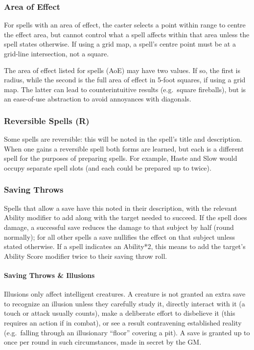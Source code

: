 \documentclass{book}
\begin{document}
\subsubsection*{Area of Effect}\label{area-of-effect}

For spells with an area of effect, the caster selects a point within
range to centre the effect area, but cannot control what a spell affects
within that area unless the spell states otherwise. If using a grid map,
a spell's centre point must be at a grid-line intersection, not a
square.

The area of effect listed for spells (AoE) may have two values. If so,
the first is radius, while the second is the full area of effect in
5-foot squares, if using a grid map. The latter can lead to
counterintuitive results (e.g.~square fireballs), but is an ease-of-use
abstraction to avoid annoyances with diagonals.

\subsubsection*{Reversible Spells (R)}\label{reversible-spells-r}

Some spells are reversible: this will be noted in the spell's title and
description. When one gains a reversible spell both forms are learned,
but each is a different spell for the purposes of preparing spells. For
example, Haste and Slow would occupy separate spell slots (and each
could be prepared up to twice).

\subsubsection*{Saving Throws}\label{saving-throws}

Spells that allow a save have this noted in their description, with the
relevant Ability modifier to add along with the target needed to
succeed. If the spell does damage, a successful save reduces the damage
to that subject by half (round normally); for all other spells a save
nullifies the effect on that subject unless stated otherwise. If a spell
indicates an Ability*2, this means to add the target's Ability Score
modifier twice to their saving throw roll.

\paragraph{Saving Throws \& Illusions}\label{saving-throws-illusions}

Illusions only affect intelligent creatures. A creature is not granted
an extra save to recognize an illusion unless they carefully study it,
directly interact with it (a touch or attack usually counts), make a
deliberate effort to disbelieve it (this requires an action if in
combat), or see a result contravening established reality (e.g.~falling
through an illusionary ``floor'' covering a pit). A save is granted up
to once per round in such circumstances, made in secret by the GM.
\end{document}
